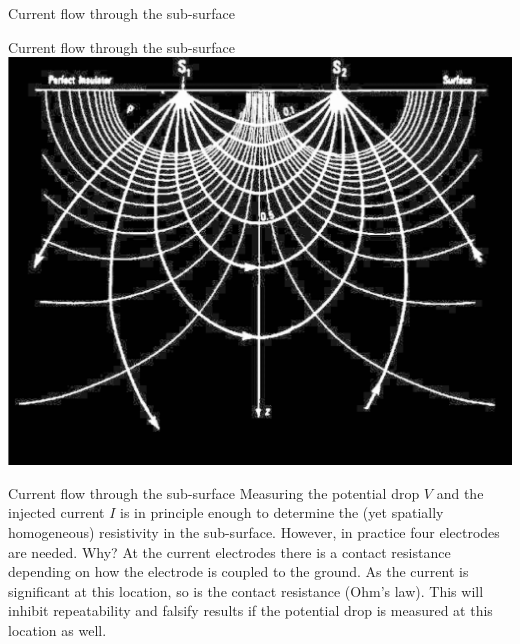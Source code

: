 \begin{frame}{Current flow through the sub-surface}
     \begin{center}
      \begin{PointSix}{Current flow through the sub-surface}
          \includegraphics[width=0.7\linewidth]{Figures/Resistivity/TwoElectrodeHomoHalfspace.png}
    \end{PointSix}
   \end{center}
 \end{frame}



\begin{frame}
  \begin{PointSix}{Current flow through the sub-surface}
   \small Measuring the potential drop $V$ and the injected current $I$ is in principle enough to determine the (yet spatially homogeneous) resistivity in the sub-surface. However, in practice four electrodes are needed. Why?
   \alert{At the current electrodes there is a contact resistance depending on how the electrode is coupled to the ground. As the current is significant at this location, so is the contact resistance (Ohm's law). This will inhibit repeatability and falsify results if the potential drop is measured at this location as well.}
  \end{PointSix}
\end{frame}



